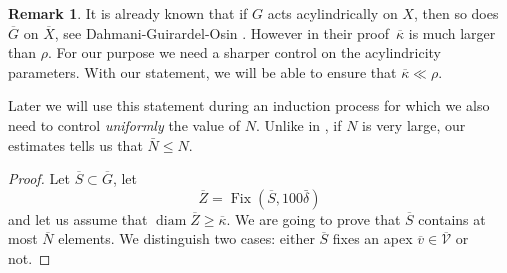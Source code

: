 \documentclass[JEP,XML,SOM,Unicode, NoEqCountersInSection,published]{cedram}
\let\mathcal\mathscr
\theoremstyle{plain}
\theoremstyle{definition}
\newtheorem{rem}[thm]{Remark}
\DeclareMathOperator{\diam}{diam}
\DeclareMathOperator{\Fix}{Fix}
\newcommand{\q}[1]{\overline{#1}}
\begin{document}
\begin{rem}
It is already known that if $G$ acts acylindrically on $X$, then so does~$\q G$ on $\q X$, see Dahmani-Guirardel-Osin \cite[Prop.\,2.17, 5.33]{dahmani_hyperbolically_2017}.
However in their proof~$\q\kappa$ is much larger than $\rho$.
For our purpose we need a sharper control on the acylindricity parameters.
With our statement, we will be able to ensure that $\q\kappa \ll \rho$.

Later we will use this statement during an induction process for which we also need to control \emph{uniformly} the value of $N$.
Unlike in \cite{dahmani_hyperbolically_2017}, if $N$ is very large, our estimates tells us that $\bar N \leq N$.
\end{rem}

\begin{proof}
Let $\q S \subset \q G$, let
\[
\q Z= \Fix(\q S, 100\bar\delta)
\]
and let us assume that $\diam \q Z \geqslant \q \kappa$.
We are going to prove that $\q S$ contains at most $\q N$ elements.
We distinguish two cases: either $\q S$ fixes an apex $\q v \in \q {\mathcal V}$ or not.


\end{proof}
\end{document}
